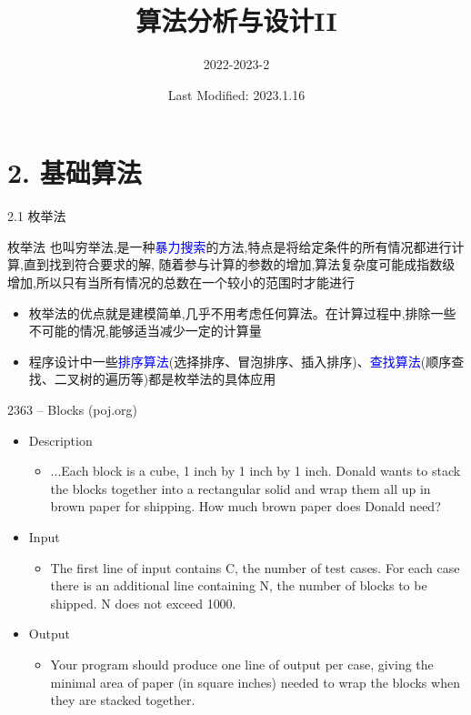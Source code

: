 \documentclass{beamer}
\title{算法分析与设计II}
\subtitle{2022-2023-2}
\date{Last Modified: 2023.1.16}
\institute{\vspace{2em} 数学与计算机学院 \\ 数据科学与大数据技术}
\begin{document}
\frame{\titlepage}

\section{2. 基础算法}
\begin{frame}{2.1 枚举法}
    \begin{block}{枚举法}
        也叫穷举法,是一种\textcolor{blue}{暴力搜索}的方法,特点是将给定条件的所有情况都进行计算,直到找到符合要求的解, 随着参与计算的参数的增加,算法复杂度可能成指数级增加,所以只有当所有情况的总数在一个较小的范围时才能进行
    \end{block}
    \vfill
    \begin{itemize}
        \item 枚举法的优点就是建模简单,几乎不用考虑任何算法。在计算过程中,排除一些不可能的情况,能够适当减少一定的计算量
        \item 程序设计中一些\textcolor{blue}{排序算法}(选择排序、冒泡排序、插入排序)、\textcolor{blue}{查找算法}(顺序查找、二叉树的遍历等)都是枚举法的具体应用
    \end{itemize}
\end{frame}
\begin{frame}{2363 -- Blocks (poj.org)}
    \begin{itemize}
        \item Description
        \begin{itemize}
            \item ...Each block is a cube, 1 inch by 1 inch by 1 inch. Donald wants to stack the blocks together into a rectangular solid and wrap them all up in brown paper for shipping. How much brown paper does Donald need?
        \end{itemize}
        \item Input
        \begin{itemize}
            \item The first line of input contains C, the number of test cases. For each case there is an additional line containing N, the number of blocks to be shipped. N does not exceed 1000.
        \end{itemize}
        \item Output
        \begin{itemize}
            \item Your program should produce one line of output per case, giving the minimal area of paper (in square inches) needed to wrap the blocks when they are stacked together.
        \end{itemize}
    \end{itemize}
\end{frame}
\end{document}
